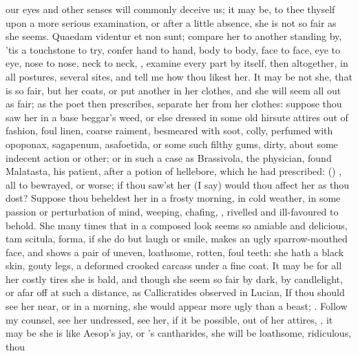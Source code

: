 our eyes and other senses will commonly deceive us; it may be, to thee
thyself upon a more serious examination, or after a little absence, she
is not so fair as she seems. Quaedam videntur et non sunt; compare her
to another standing by, 'tis a touchstone to try, confer hand to hand,
body to body, face to face, eye to eye, nose to nose, neck to neck,
\etc{}, examine every part by itself, then altogether, in all postures,
several sites, and tell me how thou likest her. It may be not she, that
is so fair, but her coats, or put another in her clothes, and she will
seem all out as fair; as the poet then prescribes, separate her
from her clothes: suppose thou saw her in a base beggar's weed, or else
dressed in some old hirsute attires out of fashion, foul linen, coarse
raiment, besmeared with soot, colly, perfumed with opoponax, sagapenum,
asafoetida, or some such filthy gums, dirty, about some indecent action
or other; or in such a case as Brassivola, the physician, found
Malatasta, his patient, after a potion of hellebore, which he had
prescribed: 
() ,
all to bewrayed, or worse; if thou saw'st her (I say) would thou affect
her as thou dost? Suppose thou beheldest her in a  frosty
morning, in cold weather, in some passion or perturbation of mind,
weeping, chafing, \etc{}, rivelled and ill-favoured to behold. She many
times that in a composed look seems so amiable and delicious, tam
scitula, forma, if she do but laugh or smile, makes an ugly
sparrow-mouthed face, and shows a pair of uneven, loathsome, rotten,
foul teeth: she hath a black skin, gouty legs, a deformed crooked
carcass under a fine coat. It may be for all her costly tires she is
bald, and though she seem so fair by dark, by candlelight, or afar off
at such a distance, as Callicratides observed in Lucian, If thou
should see her near, or in a morning, she would appear more ugly than a
beast; . Follow
my counsel, see her undressed, see her, if it be possible, out of her
attires, , it may be she is like Aesop's jay,
or \Pliny{}'s cantharides, she will be loathsome, ridiculous, thou

